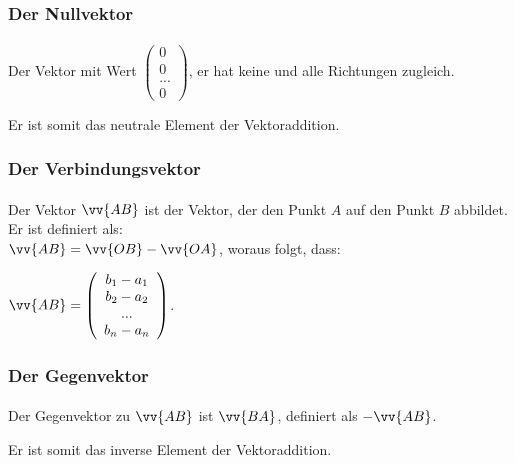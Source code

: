         \subsubsection{Der Nullvektor}

            \paragraph{} Der Vektor mit Wert $\left(\begin{array}{c} 0 \\ 0 \\ ...\\0\end{array}\right)$, er hat keine und alle Richtungen zugleich.
            \begin{Bemerkung}
                Er ist somit das neutrale Element der Vektoraddition.
            \end{Bemerkung}

        \subsubsection{Der Verbindungsvektor}

            \paragraph{} Der Vektor $\vv{AB}$ ist der Vektor, der den Punkt $A$ auf den Punkt $B$ abbildet. Er ist definiert als:\\ $\vv{AB}=\vv{OB}-\vv{OA}$,
             woraus folgt, dass: \begin{center} $\vv{AB} = \left(\begin{array}{c} b_1 - a_1 \\ b_2 - a_2 \\ ... \\ b_n - a_n \end{array}\right)$. \end{center}

        \subsubsection{Der Gegenvektor}

            \paragraph{} Der Gegenvektor zu $\vv{AB}$ ist $\vv{BA}$, definiert als  $-\vv{AB}$.
            \begin{Bemerkung}
                Er ist somit das inverse Element der Vektoraddition.
            \end{Bemerkung}

